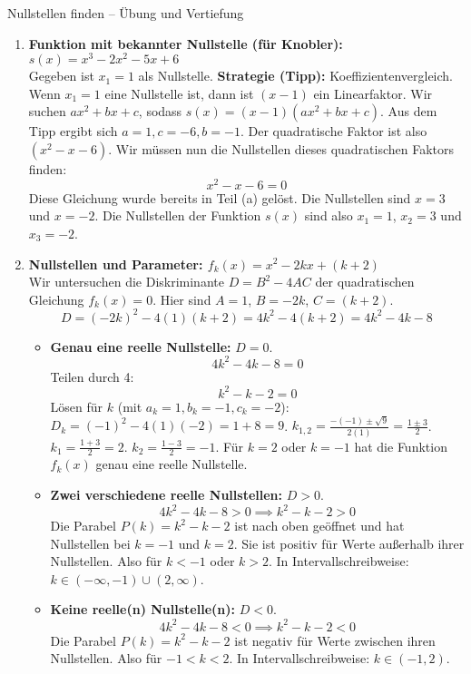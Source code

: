 \begin{loesungsumgebung}{Nullstellen finden – Übung und Vertiefung}
\begin{enumerate}[label=(\alph*)]
    \item \textbf{Funktion mit bekannter Nullstelle (für Knobler): $s(x) = x^3 - 2x^2 - 5x + 6$} \\
    Gegeben ist $x_1=1$ als Nullstelle.
    \textbf{Strategie (Tipp):} Koeffizientenvergleich. Wenn $x_1=1$ eine Nullstelle ist, dann ist $(x-1)$ ein Linearfaktor. Wir suchen $ax^2+bx+c$, sodass $s(x)=(x-1)(ax^2+bx+c)$.
    Aus dem Tipp ergibt sich $a=1, c=-6, b=-1$. Der quadratische Faktor ist also $(x^2-x-6)$.
    Wir müssen nun die Nullstellen dieses quadratischen Faktors finden:
    $$ x^2-x-6=0 $$
    Diese Gleichung wurde bereits in Teil (a) gelöst. Die Nullstellen sind $x=3$ und $x=-2$.
    Die Nullstellen der Funktion $s(x)$ sind also $x_1=1$, $x_2=3$ und $x_3=-2$.

    \item \textbf{Nullstellen und Parameter: $f_k(x) = x^2 - 2kx + (k+2)$} \\
    Wir untersuchen die Diskriminante $D = B^2-4AC$ der quadratischen Gleichung $f_k(x)=0$. Hier sind $A=1$, $B=-2k$, $C=(k+2)$.
    $$ D = (-2k)^2 - 4(1)(k+2) = 4k^2 - 4(k+2) = 4k^2 - 4k - 8 $$
    \begin{itemize}
        \item \textbf{Genau eine reelle Nullstelle:} $D=0$.
        $$ 4k^2 - 4k - 8 = 0 $$
        Teilen durch 4:
        $$ k^2 - k - 2 = 0 $$
        Lösen für $k$ (mit $a_k=1, b_k=-1, c_k=-2$):
        $D_k = (-1)^2 - 4(1)(-2) = 1+8=9$.
        $k_{1,2} = \frac{-(-1) \pm \sqrt{9}}{2(1)} = \frac{1 \pm 3}{2}$.
        $k_1 = \frac{1+3}{2} = 2$.
        $k_2 = \frac{1-3}{2} = -1$.
        Für $k=2$ oder $k=-1$ hat die Funktion $f_k(x)$ genau eine reelle Nullstelle.
        \item \textbf{Zwei verschiedene reelle Nullstellen:} $D>0$.
        $$ 4k^2 - 4k - 8 > 0 \implies k^2 - k - 2 > 0 $$
        Die Parabel $P(k) = k^2 - k - 2$ ist nach oben geöffnet und hat Nullstellen bei $k=-1$ und $k=2$. Sie ist positiv für Werte außerhalb ihrer Nullstellen.
        Also für $k < -1$ oder $k > 2$. In Intervallschreibweise: $k \in (-\infty, -1) \cup (2, \infty)$.
        \item \textbf{Keine reelle(n) Nullstelle(n):} $D<0$.
        $$ 4k^2 - 4k - 8 < 0 \implies k^2 - k - 2 < 0 $$
        Die Parabel $P(k) = k^2 - k - 2$ ist negativ für Werte zwischen ihren Nullstellen.
        Also für $-1 < k < 2$. In Intervallschreibweise: $k \in (-1, 2)$.
    \end{itemize}
\end{enumerate}

\end{loesungsumgebung}



